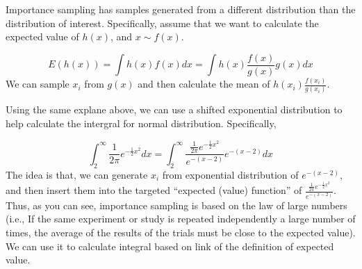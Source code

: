 \documentclass[]{book}
\begin{document}
Importance sampling has samples generated from a different distribution
than the distribution of interest. Specifically, assume that we want to
calculate the expected value of \(h(x)\), and \(x \sim f(x)\).

\[E(h(x))=\int h(x) f(x) dx = \int h(x) \frac{f(x)}{g(x)} g(x) dx \] We
can sample \(x_i\) from \(g(x)\) and then calculate the mean of
\(h(x_i) \frac{f(x_i)}{g(x_i)}\).

Using the same explane above, we can use a shifted exponential
distribution to help calculate the intergral for normal distribution.
Specifically,

\[\int_2^{\infty} \frac{1}{2 \pi} e^{-\frac{1}{2}x^2}dx = \int_2^{\infty} \frac{\frac{1}{2 \pi} e^{-\frac{1}{2}x^2}}{e^{-(x-2)}} e^{-(x-2)}dx \]
The idea is that, we can generate \(x_i\) from exponential distribution
of \(e^{-(x-2)}\), and then insert them into the targeted ``expected
(value) function'' of
\(\frac{\frac{1}{2 \pi} e^{-\frac{1}{2}x^2}}{e^{-(x-2)}}\). Thus, as you
can see, importance sampling is based on the law of large numbers (i.e.,
If the same experiment or study is repeated independently a large number
of times, the average of the results of the trials must be close to the
expected value). We can use it to calculate integral based on link of
the definition of expected value.
\end{document}

